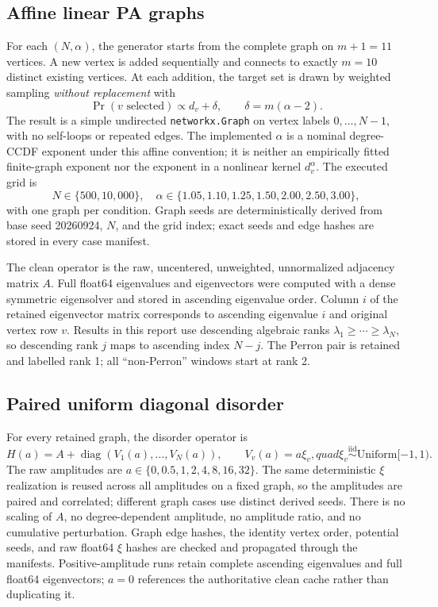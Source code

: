 \documentclass[11pt]{article}
\newcommand{\code}[1]{\texttt{#1}}
\begin{document}
\subsection{Affine linear PA graphs}

For each \((N,\alpha)\), the generator starts from the complete graph on \(m+1=11\) vertices.  A new vertex is added sequentially and connects to exactly \(m=10\) distinct existing vertices.  At each addition, the target set is drawn by weighted sampling \emph{without replacement} with
\[
  \Pr(v\text{ selected})\propto d_v+\delta,
  \qquad \delta=m(\alpha-2).
\]
The result is a simple undirected \code{networkx.Graph} on vertex labels \(0,\ldots,N-1\), with no self-loops or repeated edges.  The implemented \(\alpha\) is a nominal degree-CCDF exponent under this affine convention; it is neither an empirically fitted finite-graph exponent nor the exponent in a nonlinear kernel \(d_v^\alpha\).  The executed grid is
\[
N\in\{500,10{,}000\},\quad
\alpha\in\{1.05,1.10,1.25,1.50,2.00,2.50,3.00\},
\]
with one graph per condition.  Graph seeds are deterministically derived from base seed 20260924, \(N\), and the grid index; exact seeds and edge hashes are stored in every case manifest.

The clean operator is the raw, uncentered, unweighted, unnormalized adjacency matrix \(A\).  Full float64 eigenvalues and eigenvectors were computed with a dense symmetric eigensolver and stored in ascending eigenvalue order.  Column \(i\) of the retained eigenvector matrix corresponds to ascending eigenvalue \(i\) and original vertex row \(v\).  Results in this report use descending algebraic ranks
\(\lambda_1\geq\cdots\geq\lambda_N\), so descending rank \(j\) maps to ascending index \(N-j\).  The Perron pair is retained and labelled rank 1; all ``non-Perron'' windows start at rank 2.

\subsection{Paired uniform diagonal disorder}

For every retained graph, the disorder operator is
\[
  H(a)=A+\operatorname{diag}(V_1(a),\ldots,V_N(a)),\qquad
  V_v(a)=a\xi_v,quad \xi_v\overset{\mathrm{iid}}{\sim}\mathrm{Uniform}[-1,1).
\]
The raw amplitudes are
\(a\in\{0,0.5,1,2,4,8,16,32\}\).  The same deterministic \(\xi\) realization is reused across all amplitudes on a fixed graph, so the amplitudes are paired and correlated; different graph cases use distinct derived seeds.  There is no scaling of \(A\), no degree-dependent amplitude, no amplitude ratio, and no cumulative perturbation.  Graph edge hashes, the identity vertex order, potential seeds, and raw float64 \(\xi\) hashes are checked and propagated through the manifests.  Positive-amplitude runs retain complete ascending eigenvalues and full float64 eigenvectors; \(a=0\) references the authoritative clean cache rather than duplicating it.
\end{document}
